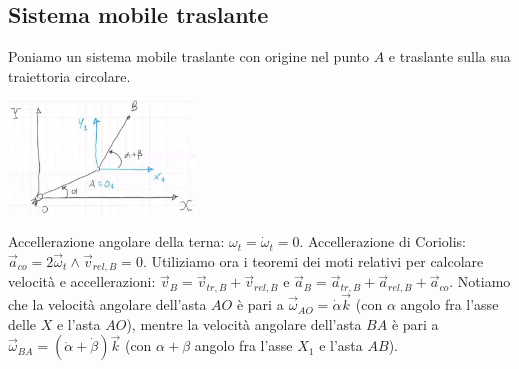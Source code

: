 \subsection{Sistema mobile traslante}
Poniamo un sistema mobile traslante con origine nel punto $A$ e traslante sulla sua traiettoria circolare.\newline
{}
\begin{center}
    \includegraphics[height=3cm]{../lezione4/img12.JPG}
\end{center}
Accellerazione angolare della terna: $\omega_t = \dot{\omega}_t = 0$.\newline
Accellerazione di Coriolis: $\vec{a}_{co} = 2 \vec{\omega}_t \land \vec{v}_{rel,B} = 0$.\newline
\newline
Utiliziamo ora i teoremi dei moti relativi per calcolare velocità e accellerazioni:\newline
$\vec{v}_B = \vec{v}_{tr,B} + \vec{v}_{rel,B}$ e $\vec{a}_B = \vec{a}_{tr,B} + \vec{a}_{rel,B} + \vec{a}_{co}$.\newline
\newline
Notiamo che la velocità angolare dell'asta $AO$ è pari a $\vec{\omega}_{AO} = \dot{\alpha} \vec{k}$ (con $\alpha$ angolo fra l'asse delle $X$ e l'asta $AO$), mentre la velocità angolare dell'asta $BA$ è pari a $\vec{\omega}_{BA} = (\dot{\alpha} + \dot{\beta}) \vec{k}$ (con $\alpha + \beta$ angolo fra l'asse $X_1$ e l'asta $AB$).\newline
{}
